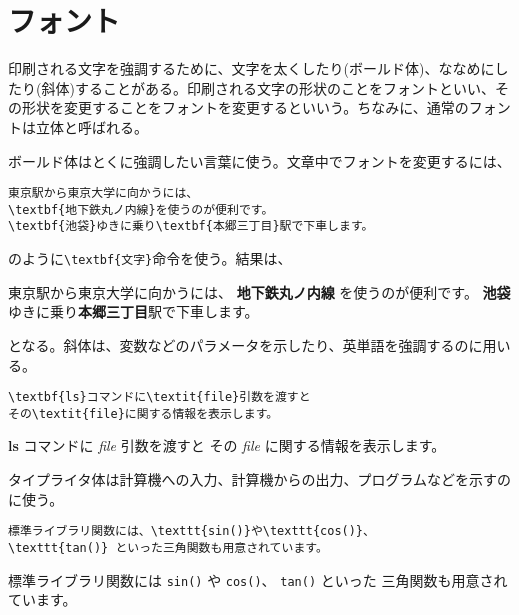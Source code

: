 \section{フォント}
\label{sec:latex:font}

印刷される文字を強調するために、文字を太くしたり(ボールド体)、ななめにしたり(斜体)することがある。印刷される文字の形状のことをフォントといい、その形状を変更することをフォントを変更するといいう。ちなみに、通常のフォントは立体と呼ばれる。

ボールド体はとくに強調したい言葉に使う。文章中でフォントを変更するには、
\begin{reidai}
\begin{verbatim}
東京駅から東京大学に向かうには、
\textbf{地下鉄丸ノ内線}を使うのが便利です。
\textbf{池袋}ゆきに乗り\textbf{本郷三丁目}駅で下車します。
\end{verbatim}
\end{reidai} \noindent
のように\verb|\textbf{文字}|命令を使う。結果は、
\begin{kekka}
東京駅から東京大学に向かうには、
\textbf{地下鉄丸ノ内線} を使うのが便利です。
\textbf{池袋}ゆきに乗り\textbf{本郷三丁目}駅で下車します。
\end{kekka} \noindent
となる。斜体は、変数などのパラメータを示したり、英単語を強調するのに用いる。
\begin{reidai}
\begin{verbatim}
\textbf{ls}コマンドに\textit{file}引数を渡すと
その\textit{file}に関する情報を表示します。
\end{verbatim}
\end{reidai}
\vspace*{-1.5em}
\begin{kekka}
\textbf{ls} コマンドに \textit{file} 引数を渡すと
その \textit{file} に関する情報を表示します。
\end{kekka} \noindent
タイプライタ体は計算機への入力、計算機からの出力、プログラムなどを示すのに使う。
\begin{reidai}
\begin{verbatim}
標準ライブラリ関数には、\texttt{sin()}や\texttt{cos()}、
\texttt{tan()} といった三角関数も用意されています。
\end{verbatim}
\end{reidai}
\vspace*{-1.5em}
\begin{kekka}
  標準ライブラリ関数には \texttt{sin()} や \texttt{cos()}、
  \texttt{tan()} といった
  三角関数も用意されています。
\end{kekka}

